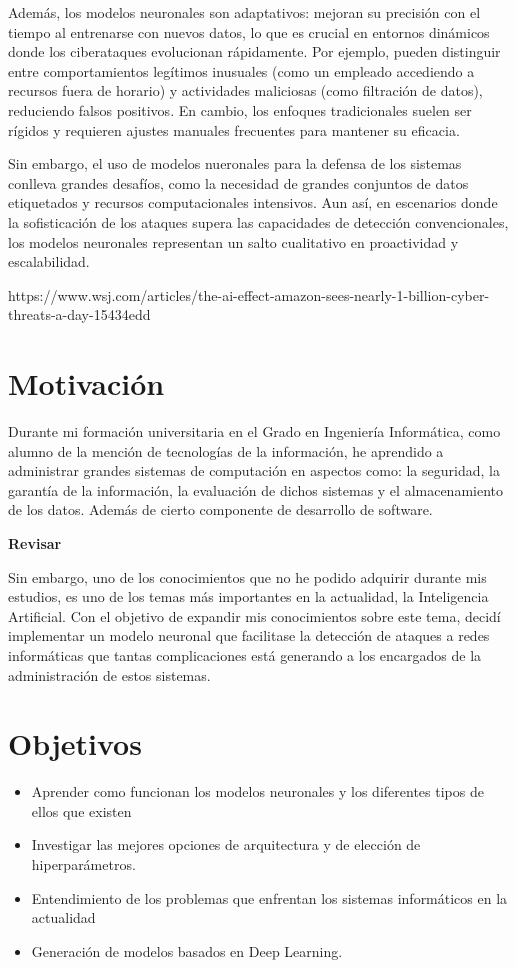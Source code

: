 Además, los modelos neuronales son adaptativos: mejoran su precisión con el tiempo al entrenarse con nuevos datos, lo que es crucial en entornos dinámicos donde los ciberataques evolucionan rápidamente. Por ejemplo, pueden distinguir entre comportamientos legítimos inusuales (como un empleado accediendo a recursos fuera de horario) y actividades maliciosas (como filtración de datos), reduciendo falsos positivos. En cambio, los enfoques tradicionales suelen ser rígidos y requieren ajustes manuales frecuentes para mantener su eficacia.

Sin embargo, el uso de modelos nueronales para la defensa de los sistemas conlleva grandes desafíos, como la necesidad de grandes conjuntos de datos etiquetados y recursos computacionales intensivos. Aun así, en escenarios donde la sofisticación de los ataques supera las capacidades de detección convencionales, los modelos neuronales representan un salto cualitativo en proactividad y escalabilidad. 


https://www.wsj.com/articles/the-ai-effect-amazon-sees-nearly-1-billion-cyber-threats-a-day-15434edd


\section{Motivación}
Durante mi formación universitaria en el Grado en Ingeniería Informática, como alumno 
de la mención de tecnologías de la información, he aprendido a administrar grandes sistemas de computación en aspectos como: la seguridad, la garantía de la información, la evaluación de dichos sistemas y el almacenamiento de los datos. Además de cierto componente de desarrollo de software.

\textbf{Revisar}

Sin embargo, uno de los conocimientos que no he podido adquirir durante mis estudios, es uno de los temas más importantes en la actualidad, la Inteligencia Artificial. Con el objetivo de expandir mis conocimientos sobre este tema, decidí implementar un modelo neuronal que facilitase la detección de ataques a redes informáticas que tantas complicaciones está generando a los encargados de la administración de estos sistemas.

 
\section{Objetivos}

\begin{itemize}
\item Aprender como funcionan los modelos neuronales y los diferentes tipos de ellos que existen
\item Investigar las mejores opciones de arquitectura y de elección de hiperparámetros.
\item Entendimiento de los problemas que enfrentan los sistemas informáticos en la actualidad
\item Generación de modelos basados en Deep Learning.
\end{itemize}


